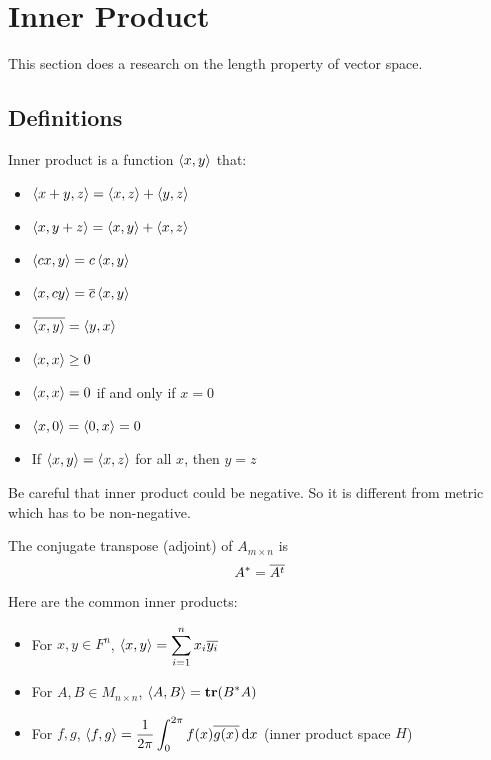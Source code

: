 \section{Inner Product}

This section does a research on the length property of vector space. 


\subsection{Definitions}

Inner product is a function $\left\langle \displaystyle x, y \right\rangle$ that:
\begin{itemize}
    \item $\left\langle \displaystyle x + y, z \right\rangle = \left\langle \displaystyle x, z \right\rangle + \left\langle \displaystyle y, z \right\rangle$    
    \item $\left\langle \displaystyle x, y+z \right\rangle = \left\langle \displaystyle x, y \right\rangle + \left\langle \displaystyle x, z \right\rangle$
    \item $\left\langle \displaystyle cx, y \right\rangle = c \left\langle \displaystyle x, y \right\rangle$
    \item $\left\langle \displaystyle x, cy \right\rangle = \overline{c} \left\langle \displaystyle x, y \right\rangle$
    \item $\overline{\left\langle \displaystyle x, y \right\rangle} = \left\langle \displaystyle y, x \right\rangle$
    \item $\left\langle \displaystyle x, x \right\rangle \geq 0$
    \item $\left\langle \displaystyle x, x \right\rangle = 0$ if and only if $x = 0$
    \item $\left\langle \displaystyle x, 0 \right\rangle = \left\langle \displaystyle 0, x \right\rangle = 0$
    \item If $\left\langle \displaystyle x, y \right\rangle = \left\langle \displaystyle x, z \right\rangle$ for all $x$, then $y = z$
\end{itemize}

Be careful that inner product could be negative. So it is different from metric which has to be non-negative.

\begin{definition}
    The conjugate transpose (adjoint) of $A_{m \times n}$ is 
    \begin{equation}
        A^* = \overline{A^t}
    \end{equation}
\end{definition}

Here are the common inner products:
\begin{itemize}
    \item For $x,y \in F^n$, $\displaystyle \left\langle \displaystyle x, y \right\rangle = \sum_{i=1}^n x_i \overline{y_i}$
    \item For $A,B \in M_{n \times n}$, $\left\langle \displaystyle A, B \right\rangle = \displaystyle \mathbf{tr}( B^* A )$
    \item For $f,g$, $\displaystyle \innerproduct{f}{g} = \frac{1}{2 \pi} \int_{0}^{2\pi} f(x) \conjugate{g(x)} \dif x$ (inner product space $H$)
\end{itemize}


